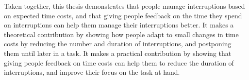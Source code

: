 
Taken together, this thesis demonstrates that people manage interruptions based on expected time costs, and that giving people feedback on the time they spend on interruptions can help them manage their interruptions better. It makes a theoretical contribution by showing how people adapt to small changes in time costs by reducing the number and duration of interruptions, and postponing them until later in a task. It makes a practical contribution by showing that giving people feedback on time costs can help them to reduce the duration of interruptions, and improve their focus on the task at hand. 

\clearpage\mbox{}\thispagestyle{empty}\clearpage
